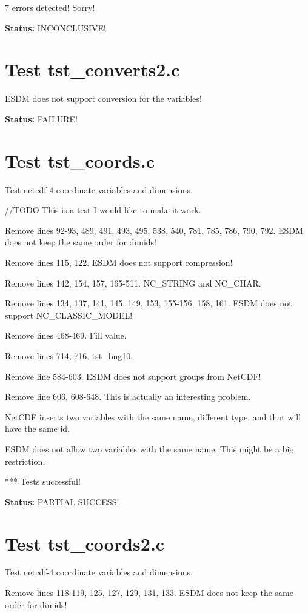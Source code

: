 7 errors detected! Sorry!

{\bf \large Status: } INCONCLUSIVE!

\section{Test tst\_converts2.c}

ESDM does not support conversion for the variables!

{\bf \large Status: } FAILURE!

\section{Test tst\_coords.c}

Test netcdf-4 coordinate variables and dimensions.

//TODO This is a test I would like to make it work.

Remove lines 92-93, 489, 491, 493, 495, 538, 540, 781, 785, 786, 790, 792. ESDM does not keep the same order for dimids!

Remove lines 115, 122. ESDM does not support compression!

Remove lines 142, 154, 157, 165-511. NC\_STRING and NC\_CHAR.

Remove lines 134, 137, 141, 145, 149, 153, 155-156, 158, 161. ESDM does not support NC\_CLASSIC\_MODEL!

Remove lines 468-469. Fill value.

Remove lines 714, 716. tst\_bug10.

Remove line 584-603. ESDM does not support groups from NetCDF!

Remove line 606, 608-648. This is actually an interesting problem.

NetCDF inserts two variables with the same name, different type, and that will have the same id.

ESDM does not allow two variables with the same name. This might be a big restriction.

*** Tests successful!

{\bf \large Status: } PARTIAL SUCCESS!

\section{Test tst\_coords2.c}

Test netcdf-4 coordinate variables and dimensions.

Remove lines 118-119, 125, 127, 129, 131, 133. ESDM does not keep the same order for dimids!

